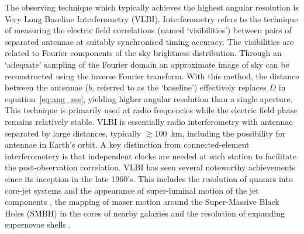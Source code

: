 The observing technique which typically achieves the highest angular resolution is Very Long Baseline Interferometry (VLBI). Interferometry refers to the technique of measuring the electric field correlations (named `visibilities') between pairs of separated antennae at suitably synchronised timing accuracy. The visibilities are related to Fourier components of the sky brightness distribution. Through an `adequate' sampling of the Fourier domain an approximate image of sky can be reconstructed using the inverse Fourier transform. With this method, the distance between the antennae ($b$, referred to as the `baseline') effectively replaces $D$ in equation~\ref{eq:ang_res}, yielding higher angular resolution than a single aperture. This technique is primarily used at radio frequencies while the electric field phase remains relatively stable. VLBI is essentially radio interferometry with antennae separated by large distances, typically $\gtrsim 100$~km, including the possibility for antennae in Earth's orbit. A key distinction from connected-element interferometery is that independent clocks are needed at each station to facilitate the post-observation correlation. VLBI has seen several noteworthy achievements since its inception in the late 1960's. This includes the resolution of quasars into core-jet systems and the appearance of super-luminal motion of the jet components \citep[e.g.][]{Whitney_1971}, the mapping of maser motion around the Super-Massive Black Holes (SMBH) in the cores of nearby galaxies \citep[e.g.][]{Miyoshi_1995} and the resolution of expanding supernovae shells \citep[e.g.][]{Pedlar_199}.


